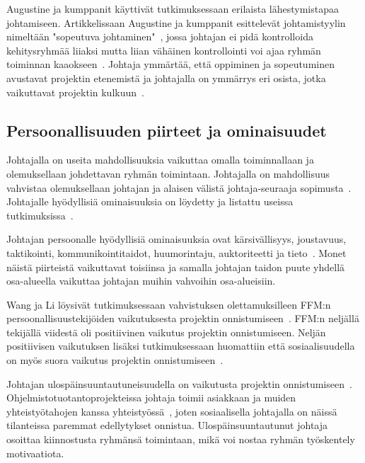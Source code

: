 \documentclass[finnish]{tktltiki2}
\theoremstyle{definition}
\theoremstyle{remark}
\begin{document}
Augustine ja kumppanit käyttivät tutkimuksessaan erilaista lähestymistapaa johtamiseen. Artikkelissaan Augustine ja kumppanit esittelevät johtamistyylin nimeltään "sopeutuva johtaminen"~\cite{Augustine:2005:APM:1101779.1101781}, jossa johtajan ei pidä kontrolloida kehitysryhmää liiaksi mutta liian vähäinen kontrollointi voi ajaa ryhmän toiminnan kaaokseen~\cite{Augustine:2005:APM:1101779.1101781}. Johtaja ymmärtää, että oppiminen ja sopeutuminen avustavat projektin etenemistä ja johtajalla on ymmärrys eri osista, jotka vaikuttavat projektin kulkuun~\cite{Augustine:2005:APM:1101779.1101781}. 





\subsection{Persoonallisuuden piirteet ja ominaisuudet}

Johtajalla on useita mahdollisuuksia vaikuttaa omalla toiminnallaan ja olemuksellaan johdettavan ryhmän toimintaan. Johtajalla on mahdollisuus vahvistaa olemuksellaan johtajan ja alaisen välistä johtaja-seuraaja sopimusta~\cite{raccoon2006leadership}. Johtajalle hyödyllisiä ominaisuuksia on löydetty ja listattu useissa tutkimuksissa~\cite{raccoon2006leadership, Wang:2009:PMP:1639950.1640049, bradley1997effect, 4017705}.

Johtajan persoonalle hyödyllisiä ominaisuuksia ovat kärsivällisyys, joustavuus, taktikointi, kommunikointitaidot, huumorintaju, auktoriteetti ja tieto~\cite{4017705}. Monet näistä piirteistä vaikuttavat toisiinsa ja samalla johtajan taidon puute yhdellä osa-alueella vaikuttaa johtajan muihin vahvoihin osa-alueisiin.

Wang ja Li löysivät tutkimuksessaan vahvistuksen olettamuksilleen FFM:n persoonallisuustekijöiden vaikutuksesta projektin onnistumiseen~\cite{Wang:2009:PMP:1639950.1640049}. FFM:n neljällä tekijällä viidestä oli positiivinen vaikutus projektin onnistumiseen. Neljän positiivisen vaikutuksen lisäksi tutkimuksessaan huomattiin että sosiaalisuudella on myös suora vaikutus projektin onnistumiseen~\cite{Wang:2009:PMP:1639950.1640049}.

Johtajan ulospäinsuuntautuneisuudella on vaikutusta projektin onnistumiseen~\cite{Wang:2009:PMP:1639950.1640049}. Ohjelmistotuotantoprojekteissa johtaja toimii asiakkaan ja muiden yhteistyötahojen kanssa yhteistyössä~\cite{McLeod:2011:FAS:1978802.1978803}, joten sosiaalisella johtajalla on näissä tilanteissa paremmat edellytykset onnistua. Ulospäinsuuntautunut johtaja osoittaa kiinnostusta ryhmänsä toimintaan, mikä voi nostaa ryhmän työskentely motivaatiota.
\end{document}
